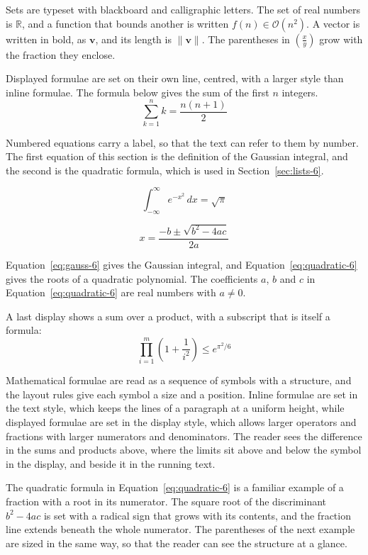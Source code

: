 \documentclass{article}
\begin{document}
Sets are typeset with blackboard and calligraphic letters. The set of real numbers is
$\mathbb{R}$, and a function that bounds another is written $f(n) \in \mathcal{O}(n^2)$.
A vector is written in bold, as $\mathbf{v}$, and its length is $\|\mathbf{v}\|$. The
parentheses in $\left( \frac{x}{y} \right)$ grow with the fraction they enclose.

Displayed formulae are set on their own line, centred, with a larger style than inline
formulae. The formula below gives the sum of the first $n$ integers.
\[
  \sum_{k=1}^{n} k = \frac{n(n+1)}{2}
\]

Numbered equations carry a label, so that the text can refer to them by number. The
first equation of this section is the definition of the Gaussian integral, and the
second is the quadratic formula, which is used in Section~\ref{sec:lists-6}.

\begin{equation}\label{eq:gauss-6}
  \int_{-\infty}^{\infty} e^{-x^{2}}\,dx = \sqrt{\pi}
\end{equation}

\begin{equation}\label{eq:quadratic-6}
  x = \frac{-b \pm \sqrt{b^{2}-4ac}}{2a}
\end{equation}

Equation~\ref{eq:gauss-6} gives the Gaussian integral, and
Equation~\ref{eq:quadratic-6} gives the roots of a quadratic polynomial. The coefficients
$a$, $b$ and $c$ in Equation~\ref{eq:quadratic-6} are real numbers with $a \neq 0$.

A last display shows a sum over a product, with a subscript that is itself a formula:
\[
  \prod_{i=1}^{m} \left( 1 + \frac{1}{i^{2}} \right) \leq e^{\pi^{2}/6}
\]

Mathematical formulae are read as a sequence of symbols with a structure, and the layout
rules give each symbol a size and a position. Inline formulae are set in the text style,
which keeps the lines of a paragraph at a uniform height, while displayed formulae are
set in the display style, which allows larger operators and fractions with larger
numerators and denominators. The reader sees the difference in the sums and products
above, where the limits sit above and below the symbol in the display, and beside it in
the running text.

The quadratic formula in Equation~\ref{eq:quadratic-6} is a familiar example of a
fraction with a root in its numerator. The square root of the discriminant
$b^{2}-4ac$ is set with a radical sign that grows with its contents, and the
fraction line extends beneath the whole numerator. The parentheses of the next example
are sized in the same way, so that the reader can see the structure at a glance.
\end{document}
